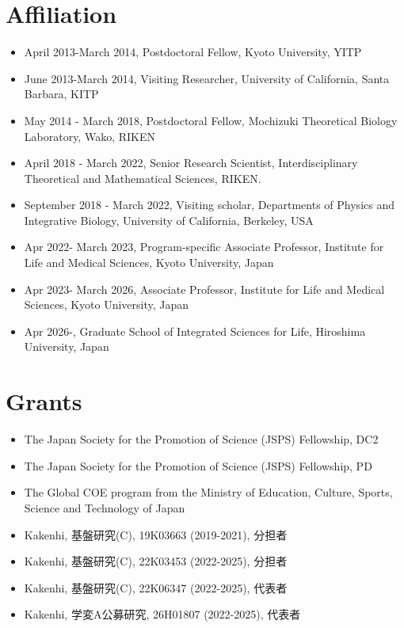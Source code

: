 \documentclass[letterpaper,12pt]{article}
\begin{document}
\section*{{\bf Affiliation}}
\begin{itemize}

\item April 2013-March 2014,  Postdoctoral Fellow, Kyoto University, YITP
\item June 2013-March 2014, Visiting Researcher, University of California, Santa Barbara, KITP
\item{May 2014 - March 2018,  Postdoctoral Fellow, Mochizuki Theoretical Biology Laboratory, Wako, RIKEN }
\item{April 2018 - March 2022,  Senior Research Scientist, Interdisciplinary Theoretical and Mathematical Sciences, RIKEN.  %
}
\item{September 2018 - March 2022, Visiting scholar,  Departments of Physics and Integrative Biology,
University of California,
Berkeley,
USA}

\item{Apr 2022- March 2023, Program-specific Associate Professor, Institute for Life and Medical Sciences,  Kyoto University, Japan}
\item{Apr 2023- March 2026, Associate Professor, Institute for  Life and Medical Sciences,  Kyoto University, Japan}
\item{Apr 2026-, Graduate School of Integrated Sciences for Life, Hiroshima University,  Japan}
\end{itemize}



\section*{{\bf  Grants}}
\begin{itemize}
\item  The Japan Society for the Promotion of Science (JSPS) Fellowship, DC2
\item  The Japan Society for the Promotion of Science (JSPS) Fellowship, PD

  \item The Global COE program from the Ministry of Education, Culture, Sports, Science and Technology of Japan
  \item Kakenhi, 基盤研究(C), 19K03663 (2019-2021), 分担者
  \item Kakenhi, 基盤研究(C), 22K03453 (2022-2025), 分担者
  \item Kakenhi, 基盤研究(C), 22K06347 (2022-2025), 代表者
   \item Kakenhi, 学変A公募研究, 26H01807 (2022-2025), 代表者
 \end{itemize}
\end{document}
